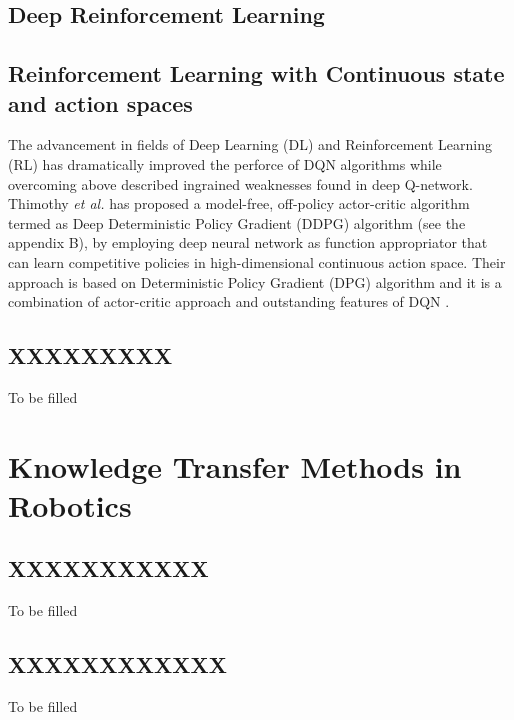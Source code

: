 \documentclass[a4paper,oneside,12pt]{report}
\begin{document}
\subsection{Deep Reinforcement Learning}




 
\subsection{Reinforcement Learning with Continuous state and action spaces }




The advancement in fields of Deep Learning (DL) and Reinforcement Learning (RL) has dramatically improved the perforce of DQN algorithms while overcoming above described ingrained weaknesses found in deep Q-network. Thimothy \textit{et al.} \cite{R06} has proposed a model-free, off-policy actor-critic algorithm termed as Deep Deterministic Policy Gradient (DDPG) algorithm (see the appendix B), by employing deep neural network as function appropriator that can learn competitive policies in high-dimensional continuous action space. Their approach is based on Deterministic Policy Gradient (DPG) algorithm \cite{R14} and it is a combination of actor-critic approach\cite{R55} and outstanding features of DQN \cite{R04} \cite{R06}. 



\subsection{XXXXXXXXX}

To be filled


\section{Knowledge Transfer Methods in Robotics}

\subsection{XXXXXXXXXXX}

To be filled

\subsection{XXXXXXXXXXXX}

To be filled
\end{document}
